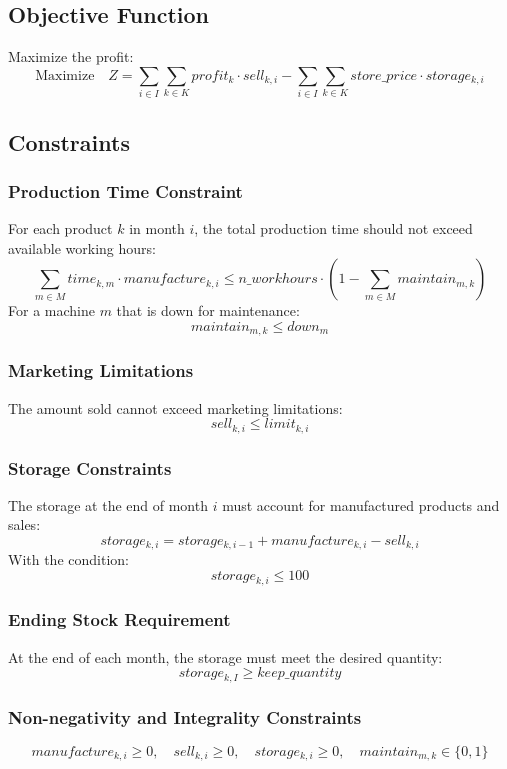 \documentclass{article}
\begin{document}
\subsection*{Objective Function}
Maximize the profit:
\[
\text{Maximize} \quad Z = \sum_{i \in I} \sum_{k \in K} profit_k \cdot sell_{k,i} - \sum_{i \in I} \sum_{k \in K} store\_price \cdot storage_{k,i}
\]

\subsection*{Constraints}

\subsubsection*{Production Time Constraint}
For each product $k$ in month $i$, the total production time should not exceed available working hours:
\[
\sum_{m \in M} time_{k,m} \cdot manufacture_{k,i} \leq n\_workhours \cdot (1 - \sum_{m \in M} maintain_{m,k})
\]
For a machine $m$ that is down for maintenance:
\[
maintain_{m,k} \leq down_m
\]

\subsubsection*{Marketing Limitations}
The amount sold cannot exceed marketing limitations:
\[
sell_{k,i} \leq limit_{k,i}
\]

\subsubsection*{Storage Constraints}
The storage at the end of month $i$ must account for manufactured products and sales:
\[
storage_{k,i} = storage_{k,i-1} + manufacture_{k,i} - sell_{k,i}
\]
With the condition:
\[
storage_{k,i} \leq 100
\]

\subsubsection*{Ending Stock Requirement}
At the end of each month, the storage must meet the desired quantity:
\[
storage_{k,I} \geq keep\_quantity
\]

\subsubsection*{Non-negativity and Integrality Constraints}
\[
manufacture_{k,i} \geq 0, \quad sell_{k,i} \geq 0, \quad storage_{k,i} \geq 0, \quad maintain_{m,k} \in \{0, 1\}
\]
\end{document}
